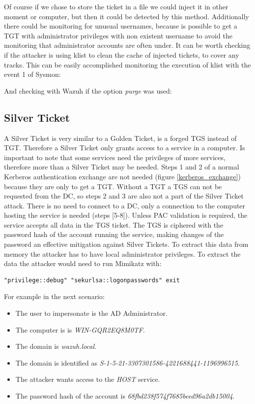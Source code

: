 Of course if we chose to store the ticket in a file we could inject it in other moment or computer, but then it could be detected by this method.
\linej
\linej
Additionally there could be monitoring for unusual usernames, because is possible to get a TGT with administrator privileges with non existent username to avoid the monitoring that administrator accounts are often under.
\linej
\linej
It can be worth checking if the attacker is using klist to clean the cache of injected tickets, to cover any tracks. This can be easily accomplished monitoring the execution of klist with the event 1 of Sysmon:

\linej
And checking with Wazuh if the option \textit{purge} was used:


\subsection{Silver Ticket}
A Silver Ticket is very similar to a Golden Ticket, is a forged TGS instead of TGT. Therefore a Silver Ticket only grants access to a service in a computer. Is important to note that some services need the privileges of more services, therefore more than a Silver Ticket may be needed.
\linej
Steps 1 and 2 of a normal Kerberos authentication exchange are not needed (figure \ref{kerberos_exchange}) because they are only to get a TGT. Without a TGT a TGS can not be requested from the DC, so steps 2 and 3 are also not a part of the Silver Ticket attack.
\linej
There is no need to connect to a DC, only a connection to the computer hosting the service is needed (steps [5-8]). Unless PAC validation is required, the service accepts all data in the TGS ticket.
\linej
The TGS is ciphered with the password hash of the account running the service, making changes of the password an effective mitigation against Silver Tickets.
To extract this data from memory the attacker has to have local administrator privileges\cite{events_1}\cite{silver_ticket}.
\linej
\linej
To extract the data the attacker would need to run Mimikatz with:
\begin{lstlisting}[style=PS,numbers=none]
"privilege::debug" "sekurlsa::logonpasswords" exit
\end{lstlisting}
\linej
For example in the next scenario:
\begin{itemize}
	\item The user to impersonate is the AD Administrator.
	\item The computer is is \textit{WIN-GQR2EQ8M0TF}.
	\item The domain is \textit{wazuh.local}.
	\item The domain is identified as \textit{S-1-5-21-3307301586-4221688441-1196996515}.
	\item The attacker wants access to the \textit{HOST} service.
	\item The password hash of the account is \textit{68fbd238f574f7685beed96a2db15004}.
\end{itemize}
